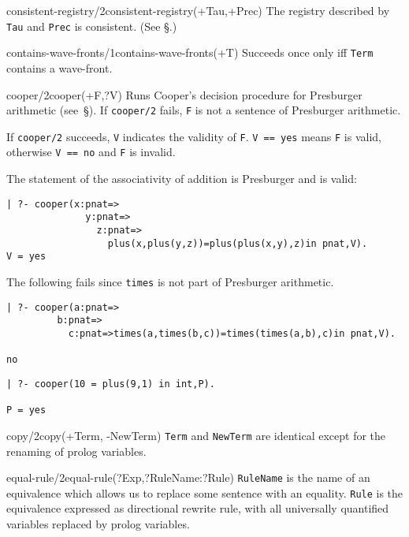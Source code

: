 \begin{predicate}{consistent-registry/2}{consistent-registry(+Tau,+Prec)}%
The registry described by {\tt Tau} and {\tt Prec} is consistent.
(See \S{}.)
\end{predicate}

\begin{predicate}{contains-wave-fronts/1}{contains-wave-fronts(+T)}%
Succeeds once only iff {\tt Term} contains a wave-front.
\end{predicate}

\begin{predicate}{cooper/2}{cooper(+F,?V)}%
Runs Cooper's decision procedure for Presburger arithmetic
(see~\S{}).  If {\tt cooper/2} fails, {\tt F} is
not a sentence of Presburger arithmetic.

If {\tt cooper/2} succeeds, {\tt V} indicates the validity of {\tt F}.
{\tt V == yes} means {\tt F} is valid, otherwise {\tt V == no} and
{\tt F} is invalid.

\begin{ex}
The statement of the associativity of addition is Presburger and is valid:
{\small\begin{verbatim}
| ?- cooper(x:pnat=>
              y:pnat=>
                z:pnat=>
                  plus(x,plus(y,z))=plus(plus(x,y),z)in pnat,V).
V = yes
\end{verbatim}
}
The following fails since {\tt times} is not part of Presburger
arithmetic.
{\small\begin{verbatim}
| ?- cooper(a:pnat=>
         b:pnat=>
           c:pnat=>times(a,times(b,c))=times(times(a,b),c)in pnat,V).

no
\end{verbatim}
}
{\small\begin{verbatim}
| ?- cooper(10 = plus(9,1) in int,P).

P = yes 
\end{verbatim}
}
\end{ex}
\end{predicate}


\begin{predicate}{copy/2}{copy(+Term, -NewTerm)}%
{\tt Term} and {\tt NewTerm} are identical except for the renaming of
prolog variables.
\end{predicate}

\begin{predicate}{equal-rule/2}{equal-rule(?Exp,?RuleName:?Rule)}%
{\tt RuleName} is the name of an equivalence which allows us to
replace some sentence with an equality. {\tt Rule} is the equivalence
expressed as directional rewrite rule, with all universally quantified
variables replaced by prolog variables.
\end{predicate}

